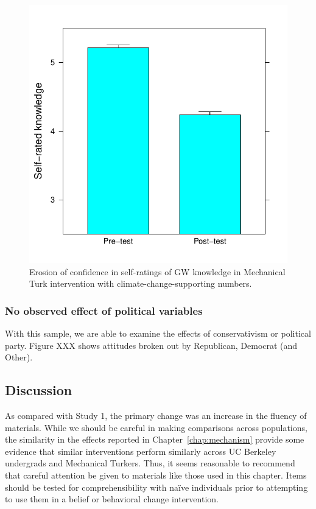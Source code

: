 \begin{figure}
    \centering
    \includegraphics{CCO-prondi-knw.pdf}
    \caption{Erosion of confidence in self-ratings of GW knowledge in Mechanical
        Turk intervention with climate-change-supporting numbers.}
    \label{fig:prondi-knw}
\end{figure}

\subsubsection{No observed effect of political variables}

With this sample, we are able to examine the effects of
conservativism or political party. Figure XXX shows attitudes broken out by
Republican, Democrat (and Other).

\subsection{Discussion}

As compared with Study 1, the primary change was an increase in the fluency of
materials. While we should be careful in making comparisons across populations,
the similarity in the effects reported in Chapter~\ref{chap:mechanism} provide
some evidence that similar interventions perform similarly across UC Berkeley
undergrads and Mechanical Turkers. Thus, it seems reasonable to recommend that
careful attention be given to materials like those used in this chapter. Items
should be tested for comprehensibility with naïve individuals prior to
attempting to use them in a belief or behavioral change intervention.

